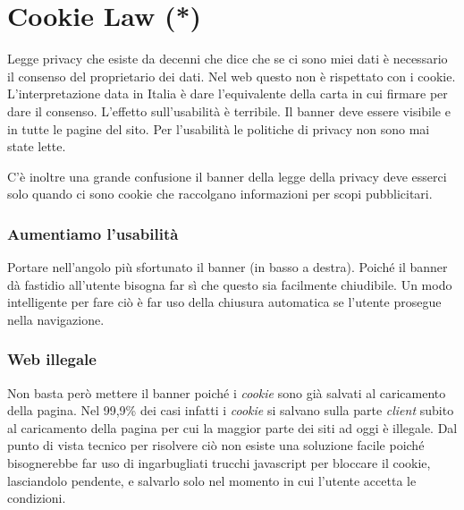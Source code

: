 
\chapter{Cookie Law (*)}
	Legge privacy che esiste da decenni che dice che se ci sono miei dati è necessario il consenso del proprietario dei dati. Nel web questo non è rispettato con i cookie. L'interpretazione data in Italia è dare l'equivalente della carta in cui firmare per dare il consenso.
	L'effetto sull'usabilità è terribile. Il banner deve essere visibile e in tutte le pagine del sito. Per l'usabilità le politiche di privacy non sono mai state lette.
	
	C'è inoltre una grande confusione il banner della legge della privacy deve esserci solo quando ci sono cookie che raccolgano informazioni per scopi pubblicitari.
	
	\subsection{Aumentiamo l'usabilità}
		Portare nell'angolo più sfortunato il banner (in basso a destra).
		Poiché il banner dà fastidio all'utente bisogna far sì che questo sia facilmente chiudibile. Un modo intelligente per fare ciò è far uso della chiusura automatica se l'utente prosegue nella navigazione.
		
	\subsection{Web illegale}
		Non basta però mettere il banner poiché i \emph{cookie} sono già salvati al caricamento della pagina. Nel 99,9\% dei casi infatti i \emph{cookie} si salvano sulla parte \emph{client} subito al caricamento della pagina per cui la maggior parte dei siti ad oggi è illegale. Dal punto di vista tecnico per risolvere ciò non esiste una soluzione facile poiché bisognerebbe far uso di ingarbugliati trucchi javascript per bloccare il cookie, lasciandolo pendente, e salvarlo solo nel momento in cui l'utente accetta le condizioni.